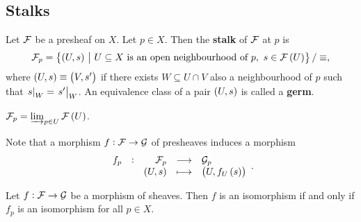 \subsection{Stalks}

\begin{definition*}
Let $ \mathcal{F} $ be a presheaf on $ X $. Let $ p \in X $. Then the \textbf{stalk} of $ \mathcal{F} $ at $ p $ is
$$ \FFF_p = \cbr{\br{U, s} \st U \subseteq X \ \text{is an open neighbourhood of} \ p, \ s \in \FFF\br{U}} / \equiv, $$
where $ \br{U, s} \equiv \br{V, s'} $ if there exists $ W \subseteq U \cap V $ also a neighbourhood of $ p $ such that $ \left. s \right|_W = \left. s' \right|_W $. An equivalence class of a pair $ \br{U, s} $ is called a \textbf{germ}.
\end{definition*}

\begin{remark*}
$ \FFF_p = \varinjlim_{p \in U} \FFF\br{U} $.
\end{remark*}

\pagebreak

Note that a morphism $ f : \mathcal{F} \to \mathcal{G} $ of presheaves induces a morphism
$$ \function[f_p]{\FFF_p}{\GGG_p}{\br{U, s}}{\br{U, f_U\br{s}}}. $$

\begin{proposition}
Let $ f : \mathcal{F} \to \mathcal{G} $ be a morphism of sheaves. Then $ f $ is an isomorphism if and only if $ f_p $ is an isomorphism for all $ p \in X $.
\end{proposition}

